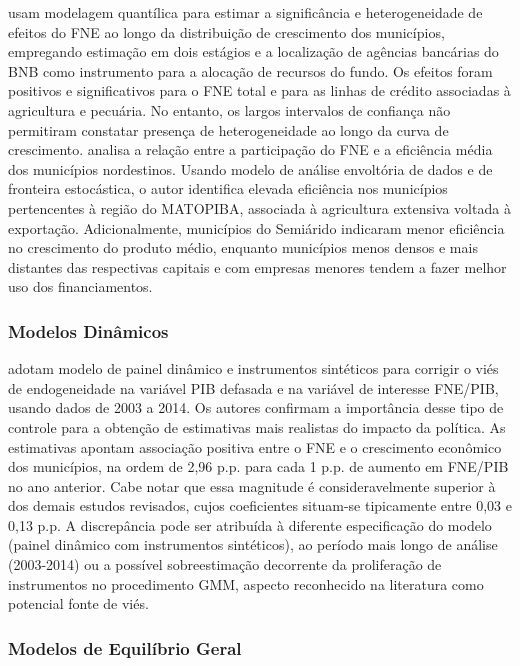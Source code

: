  usam modelagem quantílica para estimar a significância e heterogeneidade de efeitos do FNE ao longo da distribuição de crescimento dos municípios, empregando estimação em dois estágios e a localização de agências bancárias do BNB como instrumento para a alocação de recursos do fundo. Os efeitos foram positivos e significativos para o FNE total e para as linhas de crédito associadas à agricultura e pecuária. No entanto, os largos intervalos de confiança não permitiram constatar presença de heterogeneidade ao longo da curva de crescimento.  analisa a relação entre a participação do FNE e a eficiência média dos municípios nordestinos. Usando modelo de análise envoltória de dados e de fronteira estocástica, o autor identifica elevada eficiência nos municípios pertencentes à região do MATOPIBA, associada à agricultura extensiva voltada à exportação. Adicionalmente, municípios do Semiárido indicaram menor eficiência no crescimento do produto médio, enquanto municípios menos densos e mais distantes das respectivas capitais e com empresas menores tendem a fazer melhor uso dos financiamentos.

\subsubsection{Modelos Dinâmicos}

 adotam modelo de painel dinâmico e instrumentos sintéticos para corrigir o viés de endogeneidade na variável PIB defasada e na variável de interesse FNE/PIB, usando dados de 2003 a 2014. Os autores confirmam a importância desse tipo de controle para a obtenção de estimativas mais realistas do impacto da política. As estimativas apontam associação positiva entre o FNE e o crescimento econômico dos municípios, na ordem de 2,96 p.p. para cada 1 p.p. de aumento em FNE/PIB no ano anterior. Cabe notar que essa magnitude é consideravelmente superior à dos demais estudos revisados, cujos coeficientes situam-se tipicamente entre 0,03 e 0,13 p.p. A discrepância pode ser atribuída à diferente especificação do modelo (painel dinâmico com instrumentos sintéticos), ao período mais longo de análise (2003-2014) ou a possível sobreestimação decorrente da proliferação de instrumentos no procedimento GMM, aspecto reconhecido na literatura como potencial fonte de viés.

\subsubsection{Modelos de Equilíbrio Geral}

